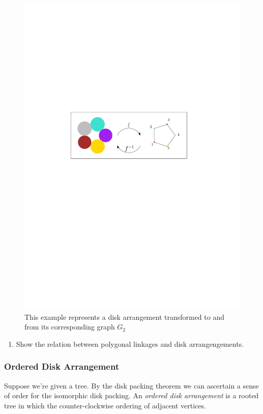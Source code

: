\begin{figure}[h]
\begin{center}
\includegraphics[scale=1]{graphics/diskPackingTheoremExample.pdf}
\end{center} 
\caption{This example represents a disk arrangement transformed to and from its corresponding graph 
$G_2$}
\label{fig:DiskArrangement-1}
\end{figure}
\begin{enumerate}%
\item Show the relation between polygonal linkages and disk arrangengements.
\end{enumerate} 
\subsubsection{Ordered Disk Arrangement}
Suppose we're given a tree. By the disk packing theorem we can ascertain a sense of order for the 
isomorphic disk packing.  An \textit{ordered disk arrangement} is a rooted tree in which the 
counter-clockwise ordering of adjacent vertices.
